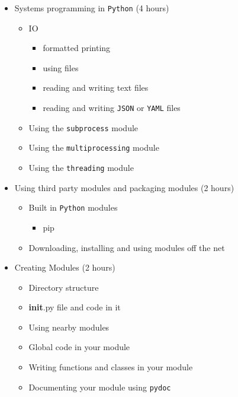 \documentclass[
]{article}
\providecommand{\tightlist}{%
  \setlength{\itemsep}{0pt}\setlength{\parskip}{0pt}}
\begin{document}
\begin{itemize}
  \begin{itemize}
  \tightlist
  \item
    Iterators
  \item
    Generators
  \end{itemize}
\item
  Systems programming in \texttt{Python} (4 hours)

  \begin{itemize}
  \tightlist
  \item
    IO

    \begin{itemize}
    \tightlist
    \item
      formatted printing
    \item
      using files
    \item
      reading and writing text files
    \item
      reading and writing \texttt{JSON} or \texttt{YAML} files
    \end{itemize}
  \item
    Using the \texttt{subprocess} module
  \item
    Using the \texttt{multiprocessing} module
  \item
    Using the \texttt{threading} module
  \end{itemize}
\item
  Using third party modules and packaging modules (2 hours)

  \begin{itemize}
  \tightlist
  \item
    Built in \texttt{Python} modules

    \begin{itemize}
    \tightlist
    \item
      pip
    \end{itemize}
  \item
    Downloading, installing and using modules off the net
  \end{itemize}
\item
  Creating Modules (2 hours)

  \begin{itemize}
  \tightlist
  \item
    Directory structure
  \item
    \textbf{init}.py file and code in it
  \item
    Using nearby modules
  \item
    Global code in your module
  \item
    Writing functions and classes in your module
  \item
    Documenting your module using \texttt{pydoc}


\end{itemize}
\end{itemize}
\end{document}
